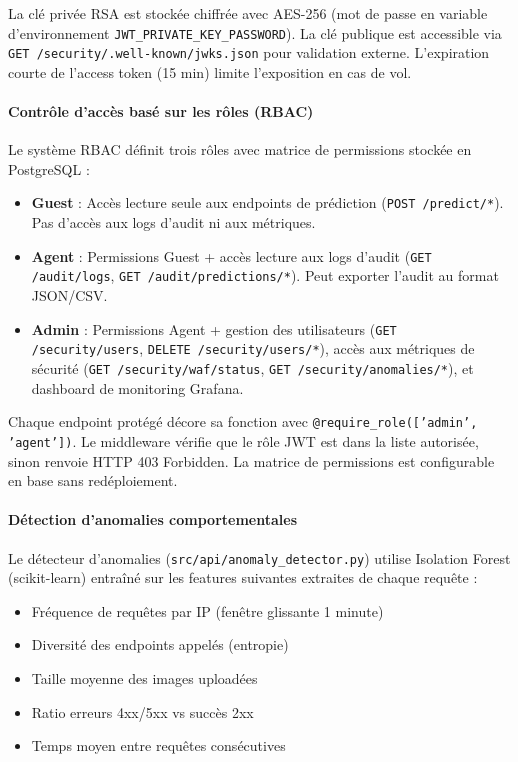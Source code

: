 La clé privée RSA est stockée chiffrée avec AES-256 (mot de passe en variable d'environnement \texttt{JWT\_PRIVATE\_KEY\_PASSWORD}). La clé publique est accessible via \texttt{GET /security/.well-known/jwks.json} pour validation externe. L'expiration courte de l'access token (15 min) limite l'exposition en cas de vol.

\paragraph{Contrôle d'accès basé sur les rôles (RBAC)}

Le système RBAC définit trois rôles avec matrice de permissions stockée en PostgreSQL :

\begin{itemize}
    \item \textbf{Guest} : Accès lecture seule aux endpoints de prédiction (\texttt{POST /predict/*}). Pas d'accès aux logs d'audit ni aux métriques.
    \item \textbf{Agent} : Permissions Guest + accès lecture aux logs d'audit (\texttt{GET /audit/logs}, \texttt{GET /audit/predictions/*}). Peut exporter l'audit au format JSON/CSV.
    \item \textbf{Admin} : Permissions Agent + gestion des utilisateurs (\texttt{GET /security/users}, \texttt{DELETE /security/users/*}), accès aux métriques de sécurité (\texttt{GET /security/waf/status}, \texttt{GET /security/anomalies/*}), et dashboard de monitoring Grafana.
\end{itemize}

Chaque endpoint protégé décore sa fonction avec \texttt{@require\_role(['admin', 'agent'])}. Le middleware vérifie que le rôle JWT est dans la liste autorisée, sinon renvoie HTTP 403 Forbidden. La matrice de permissions est configurable en base sans redéploiement.

\paragraph{Détection d'anomalies comportementales}

Le détecteur d'anomalies (\texttt{src/api/anomaly\_detector.py}) utilise Isolation Forest (scikit-learn) entraîné sur les features suivantes extraites de chaque requête :

\begin{itemize}
    \item Fréquence de requêtes par IP (fenêtre glissante 1 minute)
    \item Diversité des endpoints appelés (entropie)
    \item Taille moyenne des images uploadées
    \item Ratio erreurs 4xx/5xx vs succès 2xx
    \item Temps moyen entre requêtes consécutives
\end{itemize}

